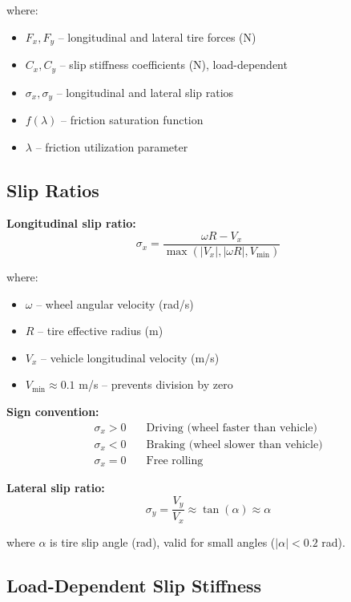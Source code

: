 \documentclass[11pt,a4paper]{article}
\begin{document}
where:
\begin{itemize}
    \item $F_x, F_y$ -- longitudinal and lateral tire forces (N)
    \item $C_x, C_y$ -- slip stiffness coefficients (N), load-dependent
    \item $\sigma_x, \sigma_y$ -- longitudinal and lateral slip ratios
    \item $f(\lambda)$ -- friction saturation function
    \item $\lambda$ -- friction utilization parameter
\end{itemize}

\subsection{Slip Ratios}

\textbf{Longitudinal slip ratio:}
\begin{equation}
\boxed{\sigma_x = \frac{\omega R - V_x}{\max(|V_x|, |\omega R|, V_{\min})}}
\label{eq:slip_ratio}
\end{equation}

where:
\begin{itemize}
    \item $\omega$ -- wheel angular velocity (rad/s)
    \item $R$ -- tire effective radius (m)
    \item $V_x$ -- vehicle longitudinal velocity (m/s)
    \item $V_{\min} \approx 0.1$ m/s -- prevents division by zero
\end{itemize}

\textbf{Sign convention:}
\begin{align}
\sigma_x > 0 &\quad \text{Driving (wheel faster than vehicle)} \\
\sigma_x < 0 &\quad \text{Braking (wheel slower than vehicle)} \\
\sigma_x = 0 &\quad \text{Free rolling}
\end{align}

\textbf{Lateral slip ratio:}
\begin{equation}
\sigma_y = \frac{V_y}{V_x} \approx \tan(\alpha) \approx \alpha
\end{equation}

where $\alpha$ is tire slip angle (rad), valid for small angles ($|\alpha| < 0.2$ rad).

\subsection{Load-Dependent Slip Stiffness}
\end{document}
